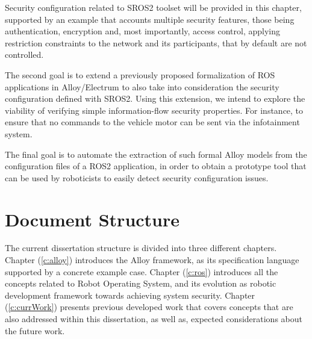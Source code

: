 Security configuration related to SROS2 toolset will be provided in this chapter, supported by an example that accounts multiple security features, those being authentication, encryption and, most importantly, access control, applying restriction constraints to the network and its participants, that by default are not controlled.

The second goal is to extend a previously proposed \cite{9341085} formalization of ROS applications in Alloy/Electrum \cite{alloy-6, lwspecification} to also take into consideration the security configuration defined with SROS2. Using this extension, we intend to explore the viability of verifying simple information-flow security properties. For instance, to ensure that no commands to the vehicle motor can be sent via the infotainment system.

The final goal is to automate the extraction of such formal Alloy models from the configuration files of a ROS2 application, in order to obtain a prototype tool that can be used by roboticists to easily detect security configuration issues.

\section{Document Structure}


The current dissertation structure is divided into three different chapters. Chapter (\ref{c:alloy}) introduces the Alloy framework, as its specification language supported by a concrete example case. Chapter (\ref{c:ros}) introduces all the concepts related to Robot Operating System, and its evolution as robotic development framework towards achieving system security. Chapter (\ref{c:currWork}) presents previous developed work that covers concepts that are also addressed within this dissertation, as well as, expected considerations about the future work. 